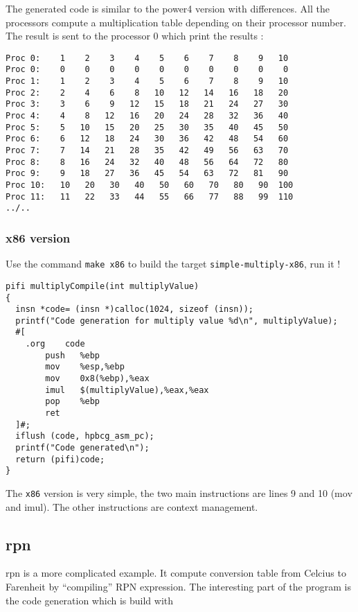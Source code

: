 \documentclass{article}
\begin{document}
The generated code is similar to the power4 version with
differences. All the processors compute a multiplication table
depending on their processor number. The result is sent to the
processor 0 which print the results :

\begin{verbatim}
Proc 0:    1    2    3    4    5    6    7    8    9   10 
Proc 0:    0    0    0    0    0    0    0    0    0    0 
Proc 1:    1    2    3    4    5    6    7    8    9   10 
Proc 2:    2    4    6    8   10   12   14   16   18   20 
Proc 3:    3    6    9   12   15   18   21   24   27   30 
Proc 4:    4    8   12   16   20   24   28   32   36   40 
Proc 5:    5   10   15   20   25   30   35   40   45   50 
Proc 6:    6   12   18   24   30   36   42   48   54   60 
Proc 7:    7   14   21   28   35   42   49   56   63   70 
Proc 8:    8   16   24   32   40   48   56   64   72   80 
Proc 9:    9   18   27   36   45   54   63   72   81   90 
Proc 10:   10   20   30   40   50   60   70   80   90  100 
Proc 11:   11   22   33   44   55   66   77   88   99  110 
../..
\end{verbatim}

\subsubsection{x86 version}

Use the command \texttt{make x86} to build the target
\texttt{simple-multiply-x86}, run it !
\begin{lstlisting}
pifi multiplyCompile(int multiplyValue)
{
  insn *code= (insn *)calloc(1024, sizeof (insn));
  printf("Code generation for multiply value %d\n", multiplyValue);
  #[
	.org	code
     	push   %ebp
     	mov    %esp,%ebp
     	mov    0x8(%ebp),%eax
        imul   $(multiplyValue),%eax,%eax
     	pop    %ebp
     	ret    
  ]#;
  iflush (code, hpbcg_asm_pc);
  printf("Code generated\n");
  return (pifi)code;
}
\end{lstlisting} %

The \texttt{x86} version is very simple, the two main instructions are
lines 9 and 10 (mov and imul). The other instructions are context
management.

\subsection{rpn}

rpn is a more complicated example. It compute conversion table from
Celcius to Farenheit by ``compiling'' RPN expression. The interesting
part of the program is the code generation which is build with 
\end{document}
